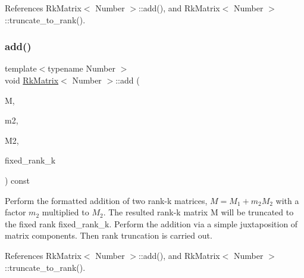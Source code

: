 References Rk\+Matrix$<$ Number $>$\+::add(), and Rk\+Matrix$<$ Number $>$\+::truncate\+\_\+to\+\_\+rank().

\mbox{\label{classRkMatrix_aeba05e73aa670b1029c1720e56d10e81}} 
\subsubsection{\texorpdfstring{add()}{add()}\hspace{0.1cm}{\footnotesize\ttfamily [7/12]}}
{\footnotesize\ttfamily template$<$typename Number $>$ \\
void \hyperlink{classRkMatrix}{Rk\+Matrix}$<$ Number $>$\+::add (\begin{DoxyParamCaption}\item[{\hyperlink{classRkMatrix}{Rk\+Matrix}$<$ Number $>$ \&}]{M,  }\item[{const Number}]{m2,  }\item[{const \hyperlink{classRkMatrix}{Rk\+Matrix}$<$ Number $>$ \&}]{M2,  }\item[{const \hyperlink{classRkMatrix_add060bfc3a4cc77f858c3d6dd58cadd5}{size\+\_\+type}}]{fixed\+\_\+rank\+\_\+k }\end{DoxyParamCaption}) const}

Perform the formatted addition of two rank-\/k matrices, $M = M_1 + m_2 M_2$ with a factor $m_2$ multiplied to $M_2$. The resulted rank-\/k matrix {\ttfamily M} will be truncated to the fixed rank {\ttfamily fixed\+\_\+rank\+\_\+k}. Perform the addition via a simple juxtaposition of matrix components. Then rank truncation is carried out.

References Rk\+Matrix$<$ Number $>$\+::add(), and Rk\+Matrix$<$ Number $>$\+::truncate\+\_\+to\+\_\+rank().

\mbox{\label{classRkMatrix_a493fe96e729d6628f1ee46b7557f2d97}} 
